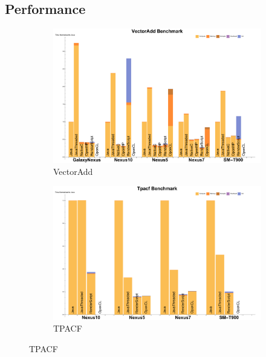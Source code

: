\subsection{Performance}

\begin{figure}[ht]

  \begin{subfigure}[b]{0.5\textwidth}
      \centering
      \includegraphics[width=\textwidth]{data/VectorAdd_time.pdf}
      \caption{VectorAdd}\label{fig:vectoradd}
  \end{subfigure}
  \begin{subfigure}[b]{0.5\textwidth}
      \centering
      \includegraphics[width=\textwidth]{data/Tpacf_time.pdf}
      \caption{TPACF}
      \label{fig:TPACF}
  \end{subfigure}


\end{figure}
